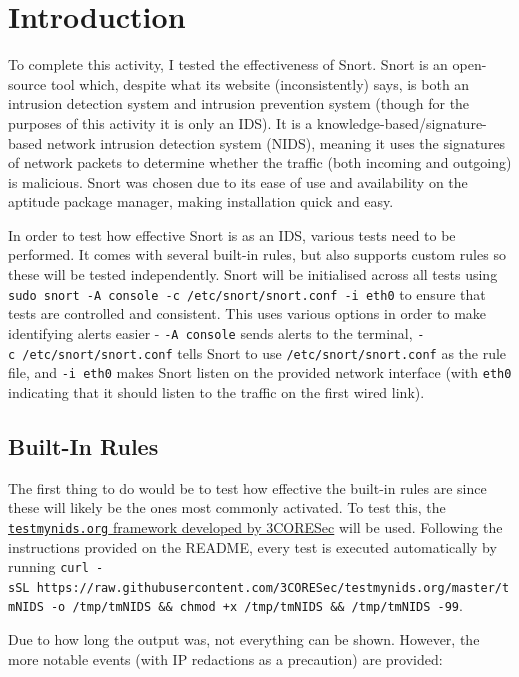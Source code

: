 \hypertarget{introduction}{%
\section{Introduction}\label{introduction}}

To complete this activity, I tested the effectiveness of Snort. Snort is
an open-source tool which, despite what its website (inconsistently)
says, is both an intrusion detection system and intrusion prevention
system (though for the purposes of this activity it is only an IDS). It
is a knowledge-based/signature-based network intrusion detection system
(NIDS), meaning it uses the signatures of network packets to determine
whether the traffic (both incoming and outgoing) is malicious. Snort was
chosen due to its ease of use and availability on the aptitude package
manager, making installation quick and easy.

In order to test how effective Snort is as an IDS, various tests need to
be performed. It comes with several built-in rules, but also supports
custom rules so these will be tested independently. Snort will be
initialised across all tests using
\texttt{sudo\ snort\ -A\ console\ -c\ /etc/snort/snort.conf\ -i\ eth0}
to ensure that tests are controlled and consistent. This uses various
options in order to make identifying alerts easier -
\texttt{-A\ console} sends alerts to the terminal,
\texttt{-c\ /etc/snort/snort.conf} tells Snort to use
\texttt{/etc/snort/snort.conf} as the rule file, and \texttt{-i\ eth0}
makes Snort listen on the provided network interface (with \texttt{eth0}
indicating that it should listen to the traffic on the first wired
link).

\hypertarget{built-in-rules}{%
\subsection{Built-In Rules}\label{built-in-rules}}

The first thing to do would be to test how effective the built-in rules
are since these will likely be the ones most commonly activated. To test
this, the
\href{https://github.com/3CORESec/testmynids.org}{\texttt{testmynids.org}
framework developed by 3CORESec} will be used. Following the
instructions provided on the README, every test is executed
automatically by running
\texttt{curl\ -sSL\ https://raw.githubusercontent.com/3CORESec/testmynids.org/master/tmNIDS\ -o\ /tmp/tmNIDS\ \&\&\ chmod\ +x\ /tmp/tmNIDS\ \&\&\ /tmp/tmNIDS\ -99}.

Due to how long the output was, not everything can be shown. However,
the more notable events (with IP redactions as a precaution) are
provided:

